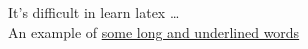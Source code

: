 \usepackage{ctex}
\usepackage{ulem}

	It's difficult in learn latex \ldots \\
	An example of  \uline{some long and underlined words}

